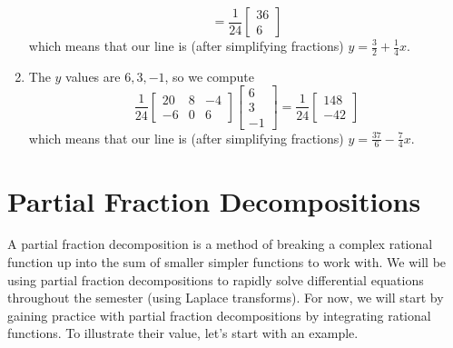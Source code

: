 \begin{example}
\begin{enumerate}
$$= \frac{1}{24}\begin{bmatrix}36\\6\end{bmatrix}
$$ which means that our line is (after simplifying fractions) $y=\frac{3}{2}+\frac{1}{4}x$.
	\item The $y$ values are $6,3,-1$, so we compute
$$\frac{1}{24}\begin{bmatrix}20&8&-4\\-6&0&6\end{bmatrix} \begin{bmatrix}6\\3\\-1\end{bmatrix}
= \frac{1}{24}\begin{bmatrix}148\\-42\end{bmatrix}
$$ which means that our line is (after simplifying fractions) $y=\frac{37}{6}-\frac{7}{4}x$.
\end{enumerate}
\end{example}















\section{Partial Fraction Decompositions}
A partial fraction decomposition is a method of breaking a complex rational function up into the sum of smaller simpler functions to work with. We will be using partial fraction decompositions to rapidly solve differential equations throughout the semester (using Laplace transforms).  For now, we will start by gaining practice with partial fraction decompositions by integrating rational functions. To illustrate their value, let's start with an example.

